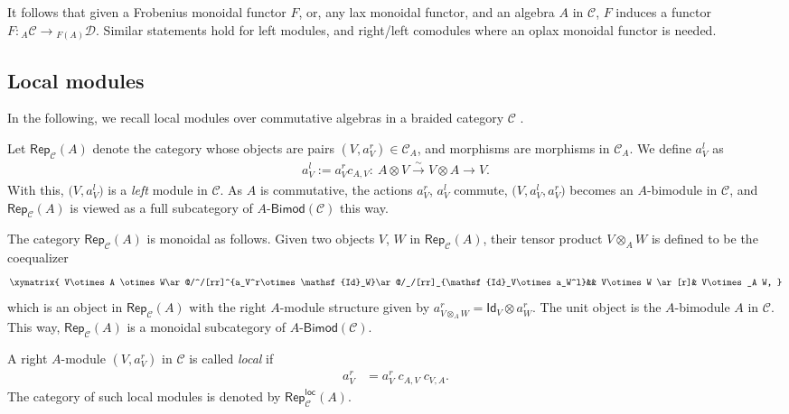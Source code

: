 \documentclass[pdftex]{sigma}
\numberwithin{equation}{section}
\newcommand{\bimod}[1]{#1\text{-}\mathsf{Bimod}}
\newcommand{\ide}{\mathsf{Id}}
\newcommand{\isomorph}{\stackrel{\sim}{\to}}
\newcommand{\Rep}{\mathsf{Rep}}
\newcommand{\locmod}{\mathsf{Rep}^{\mathsf{loc}}}
\newcommand{\cC}{\mathcal{C}}
\newcommand{\cD}{\mathcal{D}}
\begin{document}
It follows that given a Frobenius monoidal functor $F$, or, any lax monoidal functor, and an algebra $A$ in $\cC$, $F$ induces a functor $F\colon {}_A\cC\to {}_{F(A)}\cD$. Similar statements hold for left modules, and right\slash left comodules where an oplax monoidal functor is needed.

\subsection{Local modules}\label{subsec:local}

In the following, we recall local modules over commutative algebras in a braided category $\cC$ \cite{KO,LW3,Par,Sch}.

\begin{Definition}%
Let $\Rep_{\cC}(A)$ denote the category whose objects are pairs $(V,a_V^r) \in \cC_A$, and morphisms are morphisms in $\cC_A$. We define $a_V^l$ as
\begin{align*}%
a^l_V := a^r_V c_{A,V}\colon\ A\otimes V\isomorph V\otimes A \longrightarrow V.
\end{align*}
With this, $\big(V,a_V^l\big)$ is a \emph{left} module in $\cC$. As $A$ is commutative, the actions $a^r_V$, $a^l_V$ commute, $\big(V,a^l_V,a^r_V\big)$ becomes an $A$-bimodule in $\cC$, and $\Rep_{\cC}(A)$ is viewed as a full subcategory of $\bimod{A}(\cC)$ this way.

The category $\Rep_{\cC}(A)$ is monoidal as follows. Given two objects $V$, $W$ in $\Rep_{\cC}(A)$, their tensor product $V\otimes_A W$ is defined to be the coequalizer
\begin{align}\label{eq:rel-tensor}
\xymatrix{
V\otimes A \otimes W\ar@/^/[rr]^{a_V^r\otimes \ide_W}\ar@/_/[rr]_{\ide_V\otimes a_W^l}&& V\otimes W \ar[r]& V\otimes_A W,
}
\end{align}
which is an object in $\Rep_\cC(A)$ with the right $A$-module structure given by $a_{V\otimes_A W}^r = \ide_V\otimes a^r_W$. The unit object is the $A$-bimodule $A$ in $\cC$. This way, $\Rep_{\cC}(A)$ is a monoidal subcategory of $\bimod{A}(\cC)$.
\end{Definition}

\begin{Definition}%
A right $A$-module $(V,a_V^r)$ in $\cC$ is called \emph{local} if
\begin{align*}
a^r_V&=a^r_V \; c_{A,V} \; c_{V,A}.
\end{align*}
The category of such local modules is denoted by $\locmod_{\cC}(A)$.
\end{Definition}
\end{document}
